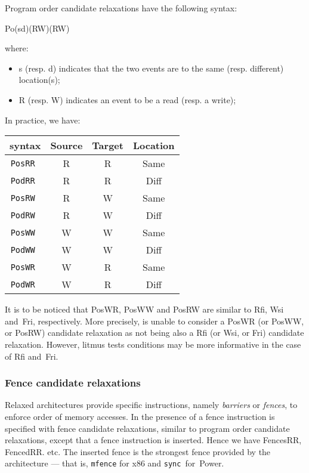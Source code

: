 Program order candidate relaxations have the following syntax:
\begin{center}
Po(s\vbar{}d)(R\vbar{}W)(R\vbar{}W)
\end{center}
where:
\begin{itemize}
\item s (resp. d) indicates that the two events are to the same (resp. different)
location(s);
\item R (resp. W) indicates an event to be a  read (resp. a write);
\end{itemize}

In practice, we have:
\begin{center}
\begin{tabular}{c|c|c|c}
\diy{} syntax  &  Source & Target  & Location \\ \hline
\tt PosRR & R & R & Same \\ \hline
\tt PodRR & R & R & Diff  \\ \hline
\tt PosRW & R & W & Same \\ \hline
\tt PodRW & R & W & Diff \\ \hline
\tt PosWW & W & W & Same \\ \hline
\tt PodWW & W & W & Diff \\ \hline
\tt PosWR & W & R & Same \\ \hline
\tt PodWR & W & R & Diff \\ \hline
\end{tabular}
\end{center}
It is to be noticed
that PosWR, PosWW and PosRW are similar to Rfi, Wsi and~Fri, respectively.
More precisely, \diy{} is unable to consider a PosWR (or PosWW, or PosRW)
candidate relaxation as not being also a Rfi (or Wsi, or Fri) candidate
relaxation.
However, litmus tests conditions may be more informative in the case of
Rfi and~Fri.




\subsubsection{Fence candidate relaxations}
Relaxed architectures provide specific instructions, namely \emph{barriers}
or \emph{fences}, to enforce order of memory accesses.
In \diy{} the presence of a fence instruction is specified with
fence candidate relaxations, similar to program order candidate relaxations,
except that a fence instruction is inserted.
Hence we have FencesRR, FencedRR. etc.
The inserted fence is the strongest fence provided by
the architecture --- that is, \texttt{mfence} for x86 and
\texttt{sync}~for~Power.

